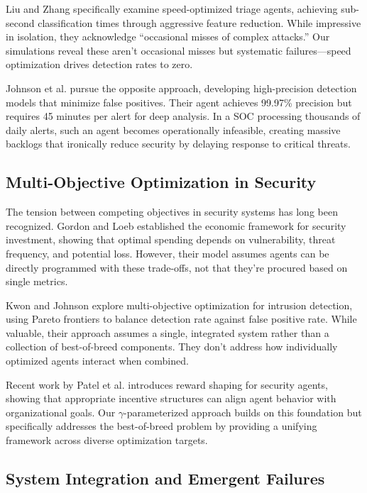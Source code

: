 \documentclass[10pt,conference]{IEEEtran}
\begin{document}
Liu and Zhang \cite{liu2023speed} specifically examine speed-optimized triage agents, achieving sub-second classification times through aggressive feature reduction. While impressive in isolation, they acknowledge ``occasional misses of complex attacks.'' Our simulations reveal these aren't occasional misses but systematic failures---speed optimization drives detection rates to zero.

Johnson et al. \cite{johnson2024accuracy} pursue the opposite approach, developing high-precision detection models that minimize false positives. Their agent achieves 99.97\% precision but requires 45 minutes per alert for deep analysis. In a SOC processing thousands of daily alerts, such an agent becomes operationally infeasible, creating massive backlogs that ironically reduce security by delaying response to critical threats.

\subsection{Multi-Objective Optimization in Security}

The tension between competing objectives in security systems has long been recognized. Gordon and Loeb \cite{gordon2002economics} established the economic framework for security investment, showing that optimal spending depends on vulnerability, threat frequency, and potential loss. However, their model assumes agents can be directly programmed with these trade-offs, not that they're procured based on single metrics.

Kwon and Johnson \cite{kwon2021multi} explore multi-objective optimization for intrusion detection, using Pareto frontiers to balance detection rate against false positive rate. While valuable, their approach assumes a single, integrated system rather than a collection of best-of-breed components. They don't address how individually optimized agents interact when combined.

Recent work by Patel et al. \cite{patel2024reward} introduces reward shaping for security agents, showing that appropriate incentive structures can align agent behavior with organizational goals. Our $\gamma$-parameterized approach builds on this foundation but specifically addresses the best-of-breed problem by providing a unifying framework across diverse optimization targets.

\subsection{System Integration and Emergent Failures}
\end{document}
